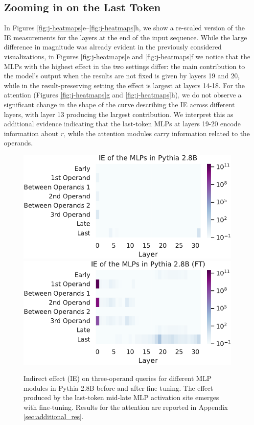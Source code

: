 \documentclass[11pt]{article}
\begin{document}
\subsection{Zooming in on the Last Token}
\label{sec:last_token}
In Figures \ref{fig:j-heatmaps}e--\ref{fig:j-heatmaps}h, we show a re-scaled version of the IE measurements for the layers at the end of the input sequence. While the large difference in magnitude was already evident in the previously considered visualizations, in Figures \ref{fig:j-heatmaps}e and \ref{fig:j-heatmaps}f we notice that the MLPs with the highest effect in the two settings differ: the main contribution to the model's output when the results are not fixed is given by layers 19 and 20, while in the result-preserving setting the effect is largest at layers 14-18. For the attention (Figures \ref{fig:j-heatmaps}g and \ref{fig:j-heatmaps}h), we do not observe a significant change in the shape of the curve describing the IE across different layers, with layer 13 producing the largest contribution. 
We interpret this as additional evidence indicating that the last-token MLPs at layers 19-20 encode information about $r$, while the attention modules carry information related to the operands.
 

\begin{figure}[t]
    \centering
    \includegraphics[width=\columnwidth]{img/pythia/3ops/pythia-3ops-mlp.pdf}
    \includegraphics[width=\columnwidth]{img/pythia/3ops/pythia-ft-3ops-mlp.pdf}
    \caption{Indirect effect (IE) on three-operand queries for different MLP modules in Pythia 2.8B before and after fine-tuning. %
    The effect produced by the last-token mid-late MLP activation site emerges with fine-tuning.
    Results for the attention are reported in Appendix \ref{sec:additional_res}.}
    \label{fig:3-ops}
\end{figure}
\end{document}
